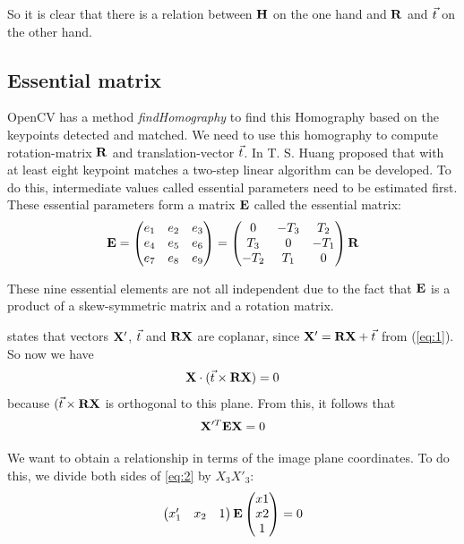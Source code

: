 So it is clear that there is a relation between $\mathbf{H}$ on the one hand and $\mathbf{R}$ and $\vec t$ on the other hand.\bigskip

\subsection{Essential matrix}
OpenCV has a method \textit{findHomography} to find this Homography based on the keypoints detected and matched. We need to use this homography to compute rotation-matrix $\mathbf{R}$ and translation-vector $\vec t$. In \cite{improc} T. S. Huang proposed that with at least eight keypoint matches a two-step linear algorithm can be developed. To do this, intermediate values called essential parameters need to be estimated first. These essential parameters form a matrix $\mathbf{E}$ called the essential matrix:
\begin{equation}
    \mathbf{E} = 
    \begin{pmatrix}
        e_1&e_2&e_3 \\
        e_4&e_5&e_6 \\
        e_7&e_8&e_9 
    \end{pmatrix}
    = \begin{pmatrix}
        0&-T_3&T_2 \\
        T_3&0&-T_1 \\
        -T_2&T_1&0
    \end{pmatrix}
     \mathbf{R}
\end{equation}

These nine essential elements are not all independent due to the fact that  $\mathbf{E}$ is a product of a skew-symmetric matrix and a rotation matrix.\bigskip

\cite{tekalp} states that vectors $\mathbf{X}'$, $\vec t$ and $\mathbf{R}\mathbf{X}$ are coplanar, since $\mathbf{X}' = \mathbf{R}\mathbf{X} + \vec t$ from (\ref{eq:1}). So now we have 
\begin{equation}
    \mathbf{X} \cdot (\vec t \times \mathbf{R}\mathbf{X}) = 0
\end{equation}
because $(\vec t \times \mathbf{R}\mathbf{X}$ is orthogonal to this plane. From this, it follows that 
\begin{equation} \label{eq:2}
    \mathbf{X}'^T\mathbf{E}\mathbf{X} = 0
\end{equation}

We want to obtain a relationship in terms of the image plane coordinates. To do this, we divide both sides of \ref{eq:2} by $X_3 X'_3$:
\begin{equation} \label{eq:essential}
    \begin{pmatrix}
        x_1'&x_2&1
    \end{pmatrix}
    \mathbf{E}
    \begin{pmatrix}
        x1 \\
        x2 \\
        1
    \end{pmatrix}
    = 0
\end{equation}

